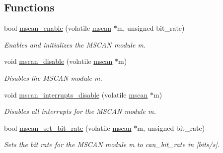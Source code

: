 \subsection*{Functions}
\begin{DoxyCompactItemize}
\item 
bool \mbox{\hyperlink{group__RTEMSBSPsPowerPCGen5200MSCAN_ga8b80a3020d69fd2993928c0aae87b068}{mscan\+\_\+enable}} (volatile \mbox{\hyperlink{group__RTEMSBSPsPowerPCGen5200MSCAN_gacfd56a4a482c5e7da2cff003284b2d51}{mscan}} $\ast$m, unsigned bit\+\_\+rate)
\begin{DoxyCompactList}\small\item\em Enables and initializes the M\+S\+C\+AN module {\itshape m}. \end{DoxyCompactList}\item 
void \mbox{\hyperlink{group__RTEMSBSPsPowerPCGen5200MSCAN_gad8c8f94ea2a29e3052664a870319cbec}{mscan\+\_\+disable}} (volatile \mbox{\hyperlink{group__RTEMSBSPsPowerPCGen5200MSCAN_gacfd56a4a482c5e7da2cff003284b2d51}{mscan}} $\ast$m)
\begin{DoxyCompactList}\small\item\em Disables the M\+S\+C\+AN module {\itshape m}. \end{DoxyCompactList}\item 
\mbox{\label{group__RTEMSBSPsPowerPCGen5200MSCAN_gad41e407b85565ec829d2d47f3ae874a2}} 
void \mbox{\hyperlink{group__RTEMSBSPsPowerPCGen5200MSCAN_gad41e407b85565ec829d2d47f3ae874a2}{mscan\+\_\+interrupts\+\_\+disable}} (volatile \mbox{\hyperlink{group__RTEMSBSPsPowerPCGen5200MSCAN_gacfd56a4a482c5e7da2cff003284b2d51}{mscan}} $\ast$m)
\begin{DoxyCompactList}\small\item\em Disables all interrupts for the M\+S\+C\+AN module {\itshape m}. \end{DoxyCompactList}\item 
\mbox{\label{group__RTEMSBSPsPowerPCGen5200MSCAN_gab0041bb347543a53b2f8bcde1cc6a586}} 
bool \mbox{\hyperlink{group__RTEMSBSPsPowerPCGen5200MSCAN_gab0041bb347543a53b2f8bcde1cc6a586}{mscan\+\_\+set\+\_\+bit\+\_\+rate}} (volatile \mbox{\hyperlink{group__RTEMSBSPsPowerPCGen5200MSCAN_gacfd56a4a482c5e7da2cff003284b2d51}{mscan}} $\ast$m, unsigned bit\+\_\+rate)
\begin{DoxyCompactList}\small\item\em Sets the bit rate for the M\+S\+C\+AN module {\itshape m} to {\itshape can\+\_\+bit\+\_\+rate} in \mbox{[}bits/s\mbox{]}. \end{DoxyCompactList}\item 

\end{DoxyCompactItemize}
